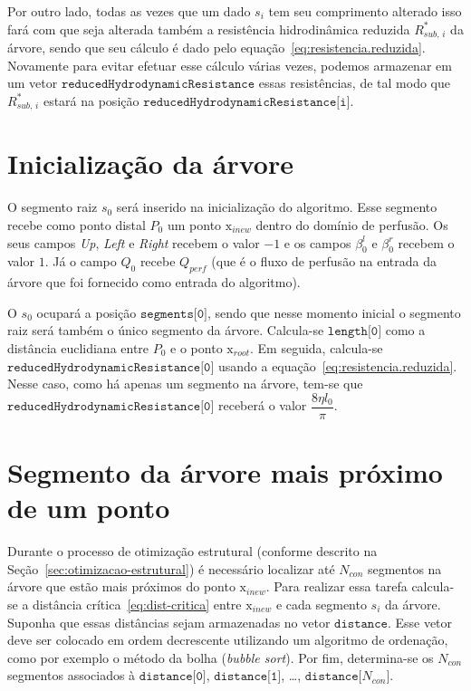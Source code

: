 \begin{apendices}
Por outro lado, todas as vezes que um dado $s_i$ tem seu comprimento alterado isso fará com que seja alterada também 
a resistência hidrodinâmica reduzida $R^*_{sub,\,i}$ da árvore, sendo que seu cálculo é dado pelo equação~\eqref{eq:resistencia.reduzida}.
Novamente para evitar efetuar esse cálculo várias vezes, podemos armazenar em um vetor $\texttt{reducedHydrodynamicResistance}$ 
essas resistências, de tal modo que $R^*_{sub,\,i}$ estará na posição $\texttt{reducedHydrodynamicResistance[i]}$.

  \section{Inicialização da árvore}\label{sec:inicializacao-da-arvore}

O segmento raiz $s_0$ será inserido na inicialização do algoritmo. Esse segmento 
recebe como ponto distal $P_0$ um ponto $\mathrm{x}_{inew}$ dentro do domínio de perfusão.
Os seus campos \textit{Up}, \textit{Left} e \textit{Right} recebem o valor $-1$ e os campos 
$\beta_0^l$ e $\beta_0^r$ recebem o valor $1$. Já o campo 
$Q_0$ recebe $Q_{perf}$ (que é o fluxo de perfusão na entrada da árvore que foi fornecido
como entrada do algoritmo).

O $s_0$ ocupará a posição $\texttt{segments[0]}$, 
sendo que nesse momento inicial o segmento raiz será também o único segmento da árvore.
Calcula-se $\texttt{length[0]}$ como a distância euclidiana entre $P_0$ e o ponto 
$\mathrm{x}_{root}$. Em seguida, calcula-se $\texttt{reducedHydrodynamicResistance[0]}$ usando a equação~\eqref{eq:resistencia.reduzida}. Nesse caso, como há apenas um segmento na árvore, tem-se que 
$\texttt{reducedHydrodynamicResistance[0]}$ receberá o valor $\dfrac{8\eta l_{0}}{\pi}$.

  \section{Segmento da árvore mais próximo de um ponto}\label{sec:vizinhanca-de-um-ponto}

Durante o processo de otimização estrutural (conforme descrito na Seção~\ref{sec:otimizacao-estrutural}) é
necessário localizar até $N_{con}$ segmentos na árvore que estão mais próximos do ponto $\mathrm{x}_{inew}$. 
Para realizar essa tarefa calcula-se a distância crítica~\eqref{eq:dist-critica} entre $\mathrm{x}_{inew}$ 
e cada segmento $s_i$ da árvore. Suponha que essas distâncias sejam armazenadas no vetor 
$\texttt{distance}$. Esse vetor deve ser colocado em ordem decrescente 
utilizando um algoritmo de ordenação, como por exemplo o método da bolha (\textit{bubble sort}). 
Por fim, determina-se os $N_{con}$ segmentos associados à $\texttt{distance[0]}$, $\texttt{distance[1]}$, 
\ldots, $\texttt{distance[}N_{con}\texttt{]}$.


\end{apendices}
